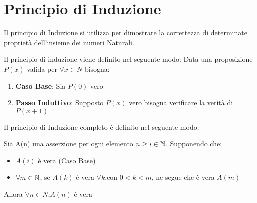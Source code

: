 \section{Principio di Induzione}
Il principio di Induzione si utilizza per dimostrare la correttezza di determinate
proprietà dell'insieme dei numeri Naturali.

Il principio di induzione viene definito nel seguente modo:\newline
Data una proposizione $P(x)$ valida per $\forall x \in N$ bisogna:
\begin{enumerate}
  \item \textbf{Caso Base}: Sia $P(0)$ vero
  \item \textbf{Passo Induttivo}: Supposto $P(x)$ vero  bisogna verificare la verità di $P(x+1)$
\end{enumerate}

Il principio di Induzione completo è definito nel seguente modo:
\begin{defi}
Sia A(n) una asserzione per ogni elemento $n \geq i \in \mathbb{N}$. Supponendo che:
\begin{itemize}
    \item $A(i)$ è vera (Caso Base)
    \item $\forall m \in \mathbb{N}$, se $A(k)$ è vera $\forall k$,con $0 < k < m$, ne segue
          che è vera $A(m)$
\end{itemize}
Allora $\forall n \in N$,$A(n)$ è vera
\end{defi}







